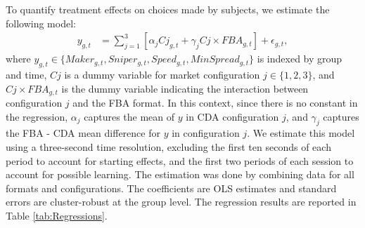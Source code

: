 \documentclass[12pt]{article}
\begin{document}
To quantify treatment effects on choices made by subjects, we estimate the following model: 
\begin{align} \label{eq:RegSpec}
y_{g,t} & = \sum_{j=1}^{3} \left[ \alpha_j Cj_{g,t} + \gamma_j  Cj \times FBA_{g,t}   \right]  + \epsilon_{g,t},
\end{align}
where $y_{g,t} \in \{Maker_{g,t},Sniper_{g,t},Speed_{g,t},MinSpread_{g,t}\}$ is indexed by group and time, $Cj$ is a dummy variable for market configuration $j \in \{1,2,3\}$, and $Cj \times FBA_{g,t}$ is the dummy variable indicating  the interaction between configuration $j$ and the FBA format. 
In this context, since there is no constant in the regression, $\alpha_j$ captures the mean of $y$ in CDA configuration $j$, and $\gamma_j$ captures the FBA - CDA mean difference for $y$ in configuration $j$. 
We estimate this model using a three-second time resolution, excluding the first ten seconds of each period to account for starting effects, and the first two periods of each session to account for possible learning. The estimation was done by combining data for all formats and configurations.  The coefficients are OLS estimates and standard errors are cluster-robust at the group level.  The regression results are reported in Table \ref{tab:Regressions}. 
\end{document}
